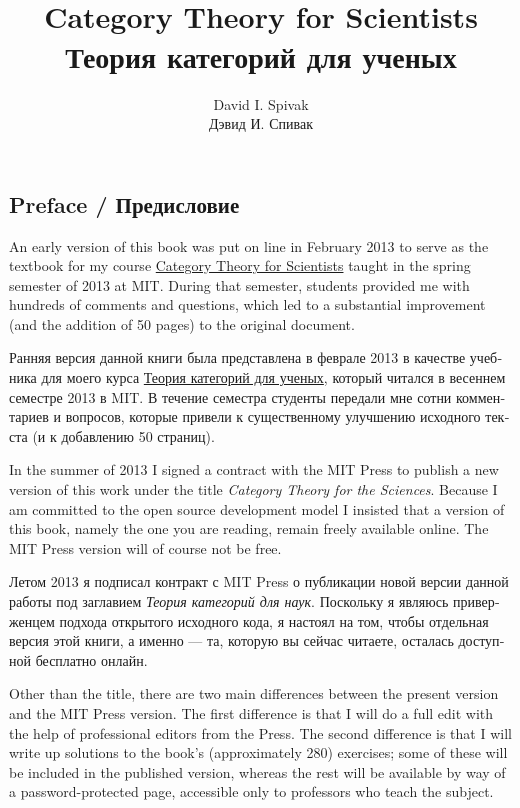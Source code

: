 \documentclass[a4paper]{book}
\title{~\\
    Category Theory for Scientists\\
    Теория категорий для ученых
  }
\author{
    David I. Spivak\\
    Дэвид И. Спивак
  }
\theoremstyle{myth}
\begin{document}
\begin{russian}
\maketitle


\chapter*{Preface / Предисловие}

An early version of this book was put on line in February 2013 to serve as the textbook for my course \href{http://math.mit.edu/~dspivak/teaching/sp13/}{\text Category Theory for Scientists} taught in the spring semester of 2013 at MIT. During that semester, students provided me with hundreds of comments and questions, which led to a substantial improvement (and the addition of 50 pages) to the original document.

Ранняя версия данной книги была представлена в феврале 2013 в качестве учебника для моего курса \href{http://math.mit.edu/~dspivak/teaching/sp13/}{\text Теория категорий для ученых}, который читался в весеннем семестре 2013 в MIT. В течение семестра студенты передали мне сотни комментариев и вопросов, которые привели к существенному улучшению исходного текста (и к добавлению 50 страниц).

In the summer of 2013 I signed a contract with the MIT Press to publish a new version of this work under the title {\em Category Theory for the Sciences}. Because I am committed to the open source development model I insisted that a version of this book, namely the one you are reading, remain freely available online. The MIT Press version will of course not be free.

Летом 2013 я подписал контракт с MIT Press о публикации новой версии данной работы под заглавием {\em Теория категорий для наук}. Поскольку я являюсь приверженцем подхода открытого исходного кода, я настоял на том, чтобы отдельная версия этой книги, а именно — та, которую вы сейчас читаете, осталась доступной бесплатно онлайн.

Other than the title, there are two main differences between the present version and the MIT Press version. The first difference is that I will do a full edit with the help of professional editors from the Press. The second difference is that I will write up solutions to the book's (approximately 280) exercises; some of these will be included in the published version, whereas the rest will be available by way of a password-protected page, accessible only to professors who teach the subject.


\end{russian}
\end{document}
